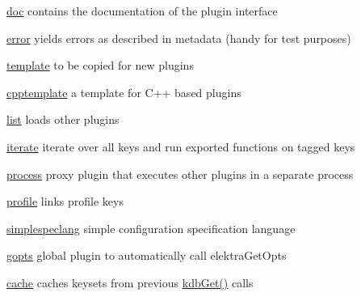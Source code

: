 \begin{DoxyItemize}
\item \hyperlink{md_src_plugins_doc_README_src_plugins_doc_README_md}{doc} contains the documentation of the plugin interface
\item \hyperlink{md_src_plugins_error_README_src_plugins_error_README_md}{error} yields errors as described in metadata (handy for test purposes)
\item \hyperlink{md_src_plugins_template_README_src_plugins_template_README_md}{template} to be copied for new plugins
\item \hyperlink{md_src_plugins_cpptemplate_README_src_plugins_cpptemplate_README_md}{cpptemplate} a template for C++ based plugins
\item \hyperlink{md_src_plugins_list_README_src_plugins_list_README_md}{list} loads other plugins
\item \hyperlink{md_src_plugins_iterate_README_src_plugins_iterate_README_md}{iterate} iterate over all keys and run exported functions on tagged keys
\item \hyperlink{md_src_plugins_process_README_src_plugins_process_README_md}{process} proxy plugin that executes other plugins in a separate process
\item \hyperlink{md_src_plugins_profile_README_src_plugins_profile_README_md}{profile} links profile keys
\item \hyperlink{md_src_plugins_simplespeclang_README_src_plugins_simplespeclang_README_md}{simplespeclang} simple configuration specification language
\item \hyperlink{md_src_plugins_gopts_README_src_plugins_gopts_README_md}{gopts} global plugin to automatically call {\ttfamily elektra\+Get\+Opts}
\item \hyperlink{md_src_plugins_cache_README_src_plugins_cache_README_md}{cache} caches keysets from previous {\ttfamily \hyperlink{group__kdb_ga28e385fd9cb7ccfe0b2f1ed2f62453a1}{kdb\+Get()}} calls 
\end{DoxyItemize}